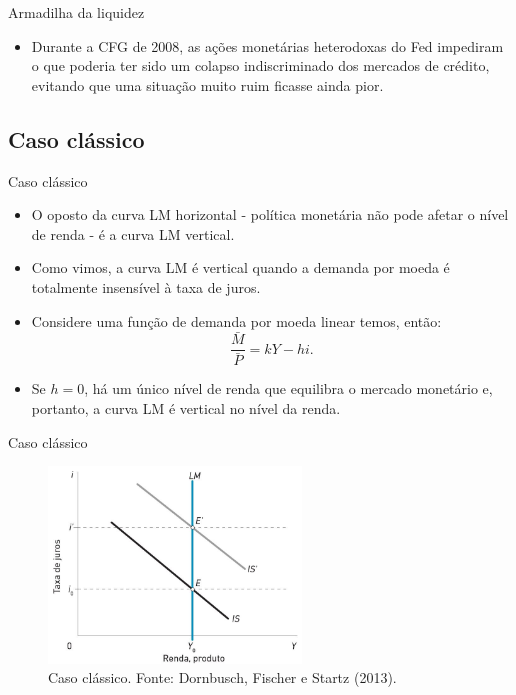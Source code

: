 \documentclass[10pt]{beamer}
\begin{document}
\begin{frame}{Armadilha da liquidez}
\begin{itemize}
    \item Durante a CFG de 2008, as ações monetárias heterodoxas do Fed impediram o que poderia ter sido um colapso indiscriminado dos mercados de crédito, evitando que uma situação muito ruim ficasse ainda pior.
\end{itemize}
\end{frame}

\subsection{Caso clássico}
\begin{frame}{Caso clássico}
    \begin{itemize}
        \item O oposto da curva LM horizontal - política monetária não pode afetar o nível de renda - é a curva LM vertical.
        \bigskip
        \item Como vimos, a curva LM é vertical quando a demanda por moeda é totalmente insensível à taxa de juros.
        \bigskip
        \item Considere uma função de demanda por moeda linear temos, então:
        \begin{equation}
            \frac{\bar{M}}{\bar{P}} = kY - hi.
            \label{eq5}
        \end{equation}
        \bigskip
        \item Se $h = 0$, há um único nível de renda que equilibra o mercado monetário e, portanto, a curva LM é vertical no nível da renda.
    \end{itemize}
\end{frame}

\begin{frame}{Caso clássico}
\begin{figure}
    \centering
    \includegraphics[width=0.6\textwidth]{./figures/aula102_fig6.JPG}
    \caption{Caso clássico. Fonte: Dornbusch, Fischer e Startz (2013).}
    \label{fig6}
\end{figure}
\end{frame}
\end{document}
